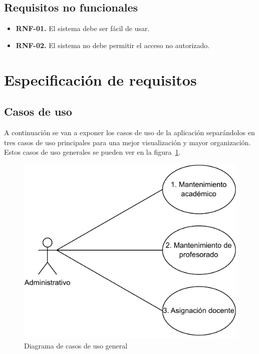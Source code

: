 \subsection{Requisitos no funcionales}
\begin{itemize}
	\item \textbf{RNF-01.} El sistema debe ser fácil de usar.
	\item \textbf{RNF-02.} El sistema no debe permitir el acceso no autorizado.

\end{itemize}

\clearpage
\section{Especificación de requisitos}
\subsection{Casos de uso}

A continuación se van a exponer los casos de uso de la aplicación separándolos en tres casos de uso principales para una mejor visualización y mayor organización. Estos casos de uso generales se pueden ver en la figura~\ref{fig:CU-general}.

\begin{figure}[!h]
	\centering
	\includegraphics[scale=0.85]{../img/Anexos/Casos uso/Diagrama casos de uso 1.pdf}
	\caption{Diagrama de casos de uso general}\label{fig:CU-general}
\end{figure}
\FloatBarrier

